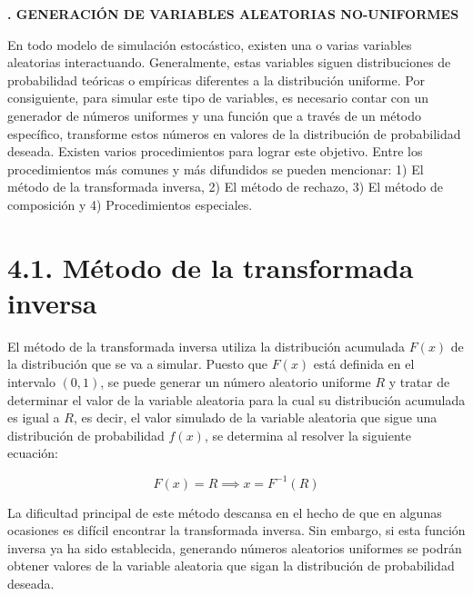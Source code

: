 \documentclass[11pt,letterpaper]{report}
\begin{document}
\begin{center}
{\LARGE\bfseries\linespread{1.3}. GENERACIÓN DE VARIABLES ALEATORIAS NO-UNIFORMES\par}
\end{center}
\vspace{0.5cm}

\setcounter{chapter}{4}
\setcounter{page}{49}

En todo modelo de simulación estocástico, existen una o varias variables aleatorias interactuando. Generalmente, estas variables siguen distribuciones de probabilidad teóricas o empíricas diferentes a la distribución uniforme. Por consiguiente, para simular este tipo de variables, es necesario contar con un generador de números uniformes y una función que a través de un método específico, transforme estos números en valores de la distribución de probabilidad deseada. Existen varios procedimientos para lograr este objetivo. Entre los procedimientos más comunes y más difundidos se pueden mencionar: 1) El método de la transformada inversa, 2) El método de rechazo, 3) El método de composición y 4) Procedimientos especiales.

\section*{4.1. Método de la transformada inversa}

El método de la transformada inversa utiliza la distribución acumulada $F(x)$ de la distribución que se va a simular. Puesto que $F(x)$ está definida en el intervalo $(0, 1)$, se puede generar un número aleatorio uniforme $R$ y tratar de determinar el valor de la variable aleatoria para la cual su distribución acumulada es igual a $R$, es decir, el valor simulado de la variable aleatoria que sigue una distribución de probabilidad $f(x)$, se determina al resolver la siguiente ecuación:

\begin{equation}
F(x) = R \implies x = F^{-1}(R)
\end{equation}

La dificultad principal de este método descansa en el hecho de que en algunas ocasiones es difícil encontrar la transformada inversa. Sin embargo, si esta función inversa ya ha sido establecida, generando números aleatorios uniformes se podrán obtener valores de la variable aleatoria que sigan la distribución de probabilidad deseada.
\end{document}
